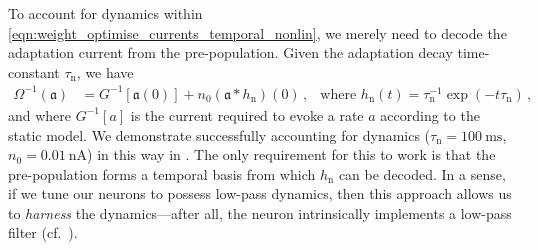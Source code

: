 To account for \ALIF dynamics within \cref{eqn:weight_optimise_currents_temporal_nonlin}, we merely need to decode the adaptation current from the pre-population.
Given the adaptation decay time-constant $\tau_\mathrm{n}$, we have
\begin{align*}
	\Omega^{-1}(\mathfrak{a}) &= G^{-1}[\mathfrak{a}(0)] + n_0 (\mathfrak{a} \ast h_\mathrm{n})(0) \,, & \text{where } h_\mathrm{n}(t) = \tau_\mathrm{n}^{-1} \exp(-t \tau_\mathrm{n}) \,,
\end{align*}
and where $G^{-1}[a]$ is the current required to evoke a rate $a$ according to the static \LIF model.
We demonstrate successfully accounting for \ALIF dynamics ($\tau_\mathrm{n} = \SI{100}{\milli\second}$, $n_0 = \SI{0.01}{\nano\ampere}$) in this way in .
The only requirement for this to work is that the pre-population forms a temporal basis from which $h_\mathrm{n}$ can be decoded.
In a sense, if we tune our neurons to possess low-pass dynamics, then this approach allows us to \emph{harness} the \ALIF dynamics---after all, the \ALIF neuron intrinsically implements a low-pass filter (cf.~).
